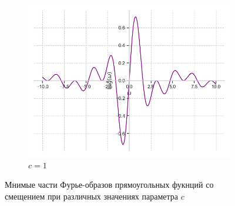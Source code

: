 \documentclass[a4paper, 16pt]{article}
\begin{document}
\begin{figure}[htbp]
\begin{subfigure}{0.3\textwidth}
            \centering
            \includegraphics[width=\linewidth]{sh_1_im_rectf_int12.png}
            \caption{$c=1$}
            \label{fig:imshrectf_3}
        \end{subfigure}
        \caption{Мнимые части Фурье-образов прямоугольных фукнций со смещением при различных значениях параметра $c$}
        \label{fig:imshrectfs}
    \end{figure}
\end{document}
